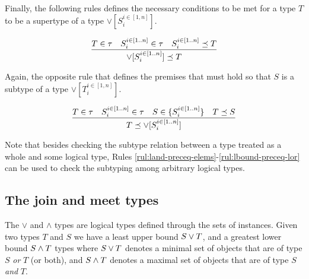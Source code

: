 \documentclass[runningheads]{llncs}
\newcommand{\I}{{\cal I}}
\newcommand{\T}{{\cal T}}
\newcommand{\memo}[1]{}
\begin{document}
Finally, the following rules defines the necessary conditions to be
met for a type $T$ to be a supertype of a type
$\lor[S_i^{i\in[1,n]}]$.

\begin{equation}
\label{rul:lor-preceq-ubound}
\dfrac{T\in\tau\quad\/S_i^{i\in[1..n]}\in\tau\quad\/S_i^{i\in[1..n]}\preceq\/T}
      {\lor[S_i^{i\in[1..n]}]\preceq\/T}  
\end{equation}

Again, the opposite rule that defines the premises that must hold so
that $S$ is a subtype of a type $\lor[T_i^{i\in[1,n]}]$.

\begin{equation}
\label{rul:lbound-preceq-lor}
\dfrac{T\in\tau\quad\/S_i^{i\in[1..n]}\in\tau\quad\/S\in\{S_i^{i\in[1..n]}\}\quad\/T\preceq\/S}
      {T\preceq\lor[S_i^{i\in[1..n]}]}  
\end{equation}

Note that besides checking the subtype relation between a type treated
as a whole and some logical type, Rules
\ref{rul:land-preceq-elems}-\ref{rul:lbound-preceq-lor} can be used to
check the subtyping among arbitrary logical types.


\memo{
Note that the interpretation of a class $C$ is a set of instances
$\llbracket\/C\rrbracket_\D=\{I\ |\ I\in\I_i\land\/I:C\}$. Further, the
interpretation of a triple type $T$ is the set of ground triples
$\llbracket\/T\rrbracket_\D=\{t\ |\ t\in\T_t\land\/t:T\}$\footnote{Triple
  types $\T_t$ are presented in the following Section
  \ref{sec:triples}.}\cite{Savnik2025}.\\}

\memo{Put together the base types of ground identifiers using $\land$ type.}
\memo{First, the base type of an ground identifier is the $\land$ of all base types.}
\memo{The \emph{base type} of a ground identifier is defined explicitely!}





\subsection{The join and meet types\label{sec:join-meet-types}}

The $\lor$ and $\land$ types are logical types defined through the
sets of instances. Given two types $T$ and $S$ we have a least upper
bound $S\lor\/T$, and a greatest lower bound $S\land\/T$ types where
$S\lor\/T$ denotes a minimal set of objects that are of type $S$
\emph{or} $T$ (or both), and $S\land\/T$ denotes a maximal set of
objects that are of type $S$ \emph{and} $T$.
\end{document}
